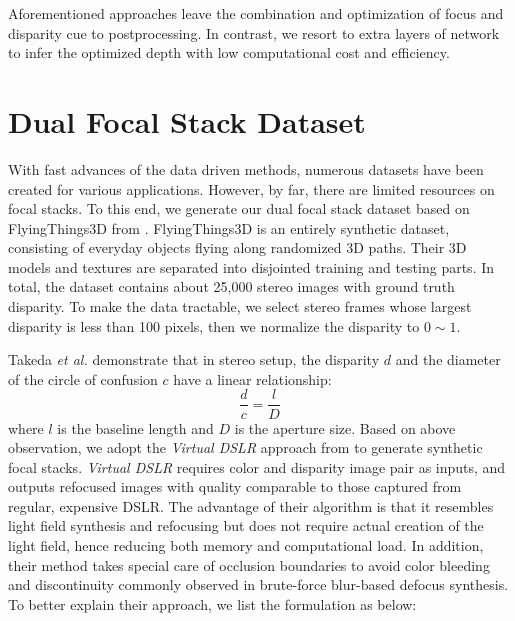 \documentclass[10pt,twocolumn,letterpaper]{article}
\begin{document}
Aforementioned approaches leave the combination and optimization of focus and disparity cue to postprocessing. In contrast, we resort to extra layers of network to infer the optimized depth with low computational cost and efficiency.




\section{Dual Focal Stack Dataset}
With fast advances of the data driven methods, numerous datasets have been created for various applications. However, by far, there are limited resources on focal stacks. To this end, we generate our dual focal stack dataset based on FlyingThings3D from \cite{mayer16}. FlyingThings3D is an entirely synthetic dataset, consisting of everyday objects flying along randomized 3D paths. Their 3D models and textures are separated into disjointed training and testing parts. In total, the dataset contains about 25,000 stereo images with ground truth disparity. To make the data tractable, we select stereo frames whose largest disparity is less than 100 pixels, then we normalize the disparity to $0\sim1$.

Takeda \emph{et al.} \cite{takeda2013fusing} demonstrate that in stereo setup, the disparity $d$ and the diameter of the circle of confusion $c$ have a linear relationship:
\begin{equation}
\frac{d}{c} = \frac{l}{D}
\end{equation}
where $l$ is the baseline length and $D$ is the aperture size. Based on above observation, we adopt the \emph{Virtual DSLR} approach from \cite{yang16} to generate synthetic focal stacks. \emph{Virtual DSLR} requires color and disparity image pair as inputs, and outputs refocused images with quality comparable to those captured from regular, expensive DSLR. The advantage of their algorithm is that it resembles light field synthesis and refocusing but does not require actual creation of the light field, hence reducing both memory and computational load. In addition, their method takes special care of occlusion boundaries to avoid color bleeding and discontinuity commonly observed in brute-force blur-based defocus synthesis.
To better explain their approach, we list the formulation as below:
\end{document}
